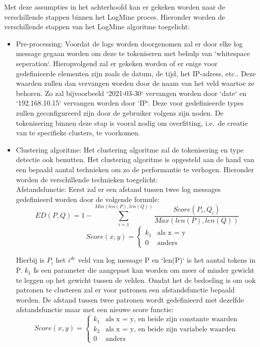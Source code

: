 Met deze assumpties in het achterhoofd kan er gekeken worden naar de verschillende stappen binnen het LogMine proces. Hieronder worden de verschillende stappen van het LogMine algoritme toegelicht:

\begin{itemize}
    \item Pre-processing: Voordat de logs worden doorgenomen zal er door elke log message gegaan worden om deze te tokeniseren met behulp van `whitespace seperation`. Hieropvolgend zal er gekeken worden of er enige voor gedefinieerde elementen zijn zoals de datum, de tijd, het IP-adress, etc.. Deze waarden zullen dan vervangen worden door de naam van het veld waartoe ze behoren. Zo zal bijvoorbeeld `2021-03-30` vervangen worden door `date` en `192.168.10.15` vervangen worden door `IP`. Deze voor gedefinieerde types zullen geconfigureerd zijn door de gebruiker volgens zijn noden. De tokenisering binnen deze stap is vooral nodig om overfitting, i.e.\ de creatie van te specifieke clusters, te voorkomen.\\
    
    \item Clustering algoritme: Het clustering algoritme zal de tokenisering en type detectie ook benutten. Het clustering algoritme is opgesteld aan de hand van een bepaald aantal technieken om zo de performantie te verhogen. Hieronder worden de verschillende technieken toegelicht:\\
    
    \subitem Afstandsfunctie:  Eerst zal er een afstand tussen twee log messages gedefinieerd worden door de volgende formule:
    \[ED(P,Q) = 1 - \sum_{i=1}^{Min(len(P), len(Q))} \frac{Score(P_{i},Q_{i})}{Max(len(P), len(Q))} \]
    \[Score(x,y) = \begin{cases}
        k_{1} & \text{als x = y}\\
        0 & \text{anders}
    \end{cases}\]
    
    Hierbij is \(P_{i}\) het \(i^{de}\) veld van log message P en `len(P)` is het aantal tokens in P. \(k_{1}\) Is een parameter die aangepast kan worden om meer of minder gewicht te leggen op het gewicht tussen de velden. Omdat het de bedoeling is om ook patronen te clusteren zal er voor patronen een afstandsfunctie bepaald worden. De afstand tussen twee patronen wordt gedefinieerd met dezelfde afstandsfunctie maar met een nieuwe score functie:
    \[Score(x,y) = \begin{cases}
        k_{1} & \text{als x = y, en beide zijn constante waarden}\\
        k_{2} & \text{als x = y, en beide zijn variabele waarden}\\
        0 & \text{anders}
    \end{cases}\]
    

\end{itemize}
